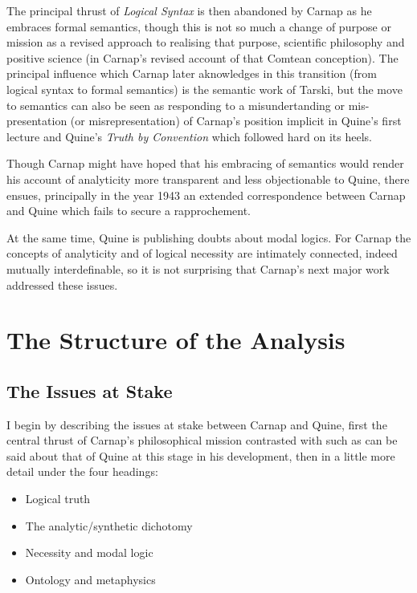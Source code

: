 The principal thrust of {\it Logical Syntax} is then abandoned by
Carnap as he embraces formal semantics, though this is not so
much a change of purpose or mission as a revised approach to realising
that purpose, scientific philosophy and positive science
(in Carnap's revised account of that Comtean conception).
The principal influence which Carnap later aknowledges in this
transition (from logical syntax to formal semantics) is the
semantic work of Tarski, but the move to semantics can also
be seen as responding to a misundertanding or mis-presentation
(or misrepresentation) of Carnap's position implicit in Quine's
first lecture and Quine's {\it Truth by Convention} \cite{quine36}
which followed hard on its heels.

Though Carnap might have hoped that his embracing of semantics
would render his account of analyticity more transparent and less
objectionable to Quine, there ensues, principally in the year 1943
an extended correspondence between Carnap and Quine \cite{carnap90}
which fails to secure a rapprochement.

At the same time, Quine is publishing doubts about modal logics.
For Carnap the concepts of analyticity and of logical necessity
are intimately connected, indeed mutually interdefinable, so
it is not surprising that Carnap's next major work addressed these
issues.

\section{The Structure of the Analysis}

\subsection{The Issues at Stake}

I begin by describing the issues at stake between Carnap and Quine,
first the central thrust of Carnap's philosophical mission contrasted
with such as can be said about that of Quine at this stage in his
development, then in a little more detail under the four headings:

\begin{itemize}
\item Logical truth
\item The analytic/synthetic dichotomy
\item Necessity and modal logic
\item Ontology and metaphysics
\end{itemize}

